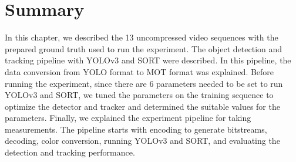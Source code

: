 \section{Summary}
\label{sec:methods/summary}

In this chapter, we described the 13 uncompressed video sequences with the prepared ground truth used to run the experiment. The object detection and tracking pipeline with YOLOv3 and SORT were described. In this pipeline, the data conversion from YOLO format to MOT format was explained. Before running the experiment, since there are 6 parameters needed to be set to run YOLOv3 and SORT, we tuned the parameters on the training sequence to optimize the detector and tracker and determined the suitable values for the parameters. Finally, we explained the experiment pipeline for taking measurements. The pipeline starts with encoding to generate bitstreams, decoding, color conversion, running YOLOv3 and SORT, and evaluating the detection and tracking performance.